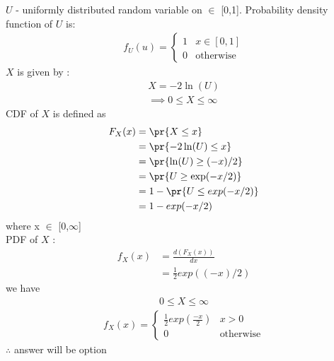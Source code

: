 $U$ - uniformly distributed random variable on $\in$ [0,1]. 
Probability density function of $U$ is: 
\begin{align}
    f_U(u) =
    \begin{cases}
     1  & x \in  [0,1] \\
    0 & \text{otherwise} 
    \end{cases}
\end{align}
 $X$ is given by :
\begin{align}
  X = -2 \ln(U) \\
\implies    0 \leq X \leq \infty
\end{align}
CDF of  $X$ is defined as 
\begin{align}
    F_X(x) &= \pr{X \le x} \\
           &= \pr{-2 \ln(U)\le x} \\
           &= \pr{\ln(U) \ge( -x) /2}\\
           &= \pr {U \ge \exp(-x/2)}\\
           &= 1 - \pr{U \le exp(-x/2)}\\
           &= 1 - exp(-x/2) 
\end{align}
where x $\in$ [0,$\infty$] \\
PDF of $X$ : 
\begin{align}
    f_X(x) & = \frac{d (F_X (x)) }{dx} \\
           & = \frac{1}{2}  exp((-x)/2)
\end{align}
 we have     
\begin{align}
    0 \leq X \leq \infty
\end{align}
\begin{align}
    f_X(x) =
    \begin{cases}
    \frac{1}{2}  exp(\frac{-x}{2}) & x > 0 \\
    0 & \text{otherwise}
    \end{cases}
\end{align}
$\therefore$ answer will be option 
